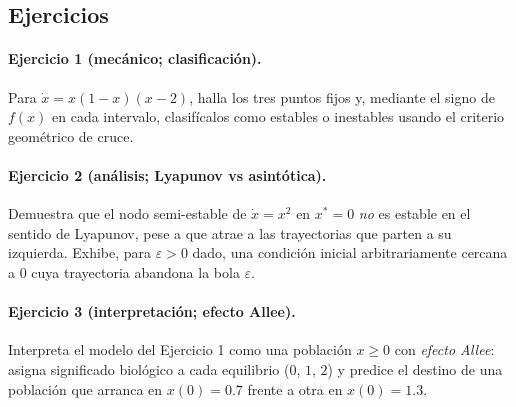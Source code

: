 \subsection{Ejercicios}

\paragraph{Ejercicio 1 (mecánico; clasificación).} Para $\dot{x} = x(1-x)(x-2)$, halla los tres puntos fijos y, mediante el signo de $f(x)$ en cada intervalo, clasifícalos como estables o inestables usando el criterio geométrico de cruce.

\paragraph{Ejercicio 2 (análisis; Lyapunov vs asintótica).} Demuestra que el nodo semi-estable de $\dot{x}=x^2$ en $x^*=0$ \emph{no} es estable en el sentido de Lyapunov, pese a que atrae a las trayectorias que parten a su izquierda. Exhibe, para $\varepsilon>0$ dado, una condición inicial arbitrariamente cercana a $0$ cuya trayectoria abandona la bola $\varepsilon$.

\paragraph{Ejercicio 3 (interpretación; efecto Allee).} Interpreta el modelo del Ejercicio 1 como una población $x\ge 0$ con \emph{efecto Allee}: asigna significado biológico a cada equilibrio ($0$, $1$, $2$) y predice el destino de una población que arranca en $x(0)=0.7$ frente a otra en $x(0)=1.3$.

